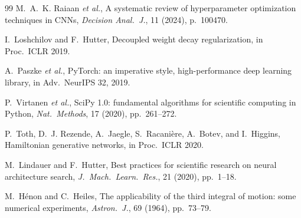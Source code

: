 \documentclass[11pt]{article}
\theoremstyle{definition}
\begin{document}
\begin{thebibliography}{99}
M.~A.~K. Raiaan \textit{et al.},
A systematic review of hyperparameter optimization techniques in CNNs,
\textit{Decision Anal.\ J.}, 11 (2024), p.~100470.

I.~Loshchilov and F.~Hutter,
Decoupled weight decay regularization,
in Proc.\ ICLR 2019.

A.~Paszke \textit{et al.},
PyTorch: an imperative style, high-performance deep learning library,
in Adv.\ NeurIPS 32, 2019.

P.~Virtanen \textit{et al.},
SciPy 1.0: fundamental algorithms for scientific computing in Python,
\textit{Nat.\ Methods}, 17 (2020), pp.~261--272.

P.~Toth, D.~J. Rezende, A.~Jaegle, S.~Racani\`{e}re, A.~Botev,
and I.~Higgins,
Hamiltonian generative networks,
in Proc.\ ICLR 2020.

M.~Lindauer and F.~Hutter,
Best practices for scientific research on neural architecture search,
\textit{J.\ Mach.\ Learn.\ Res.}, 21 (2020), pp.~1--18.

M.~H\'{e}non and C.~Heiles,
The applicability of the third integral of motion: some numerical
experiments,
\textit{Astron.\ J.}, 69 (1964), pp.~73--79.

\end{thebibliography}
\end{document}
